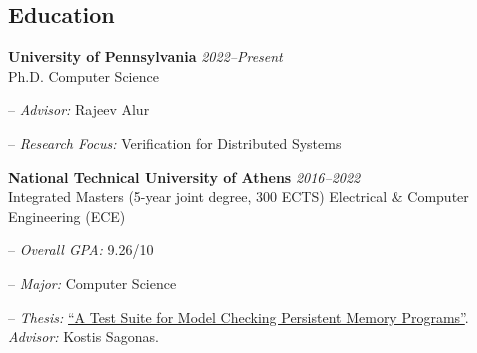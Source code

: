 \documentclass[margin, 10.5pt]{res}
\newcommand{\field}[2]{\noindent \textbf{#1} \hfill #2 \\}
\begin{document}
\begin{resume}


\section{Education}

\field{University of Pennsylvania}  {\emph{2022--Present}} 
Ph.D. Computer Science
\begin{compactitem}
\item[--] \emph{Advisor:} Rajeev Alur
\item[--] \emph{Research Focus:} Verification for Distributed Systems
\end{compactitem}
 
\field{National Technical University of Athens}  {\emph{2016--2022}} 
Integrated Masters (5-year joint degree, 300 ECTS) Electrical \& Computer Engineering (ECE)
\begin{compactitem}
\item[--] \emph{Overall GPA:} 9.26/10 
\item[--] \emph{Major:} Computer Science 
\item[--] \emph{Thesis:} \href{http://artemis.cslab.ece.ntua.gr:8080/jspui/bitstream/123456789/18415/1/thesis.pdf}{``A Test Suite for Model Checking Persistent Memory Programs''}. \emph{Advisor:} Kostis Sagonas.
\end{compactitem} 

\begin{comment}
\section{Research \\ Experience}

\textbf{Business Analytics Lab (Undergraduate Researcher)} \hfill \emph{August 2018 --}
\begin{compactitem}
\item[--] Conduct research on Machine Learning on Software Engineering
\begin{compactitem}
\item Source Code Embeddings
\item Software Clustering
\item Layering Violations
\end{compactitem}
\item[--] Research funded by the \textsc{Crossminer} project, supported by \emph{Horizon 2020} grant
\item[--] Research Advisor: Prof. Diomidis Spinellis
\end{compactitem}
\end{comment}


\end{resume}
\end{document}
